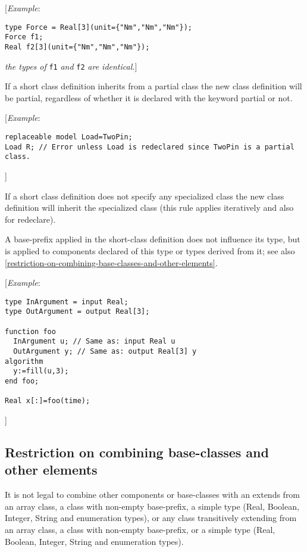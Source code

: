 {[}\emph{Example}:
\begin{lstlisting}[language=modelica]
type Force = Real[3](unit={"Nm","Nm","Nm"});
Force f1;
Real f2[3](unit={"Nm","Nm","Nm"});
\end{lstlisting}
\emph{the types of} \lstinline!f1! \emph{and} \lstinline!f2! \emph{are identical.}{]}

If a short class definition inherits from a partial class the new class
definition will be partial, regardless of whether it is declared with
the keyword partial or not.

{[}\emph{Example}:
\begin{lstlisting}[language=modelica]
replaceable model Load=TwoPin;
Load R; // Error unless Load is redeclared since TwoPin is a partial class.
\end{lstlisting}

{]}

If a short class definition does not specify any specialized class the
new class definition will inherit the specialized class (this rule
applies iteratively and also for redeclare).

A base-prefix applied in the short-class definition does not influence
its type, but is applied to components declared of this type or types
derived from it; see also \autoref{restriction-on-combining-base-classes-and-other-elements}.

{[}\emph{Example}:
\begin{lstlisting}[language=modelica]
type InArgument = input Real;
type OutArgument = output Real[3];

function foo
  InArgument u; // Same as: input Real u
  OutArgument y; // Same as: output Real[3] y
algorithm
  y:=fill(u,3);
end foo;

Real x[:]=foo(time);
\end{lstlisting}

{]}

\subsection{Restriction on combining base-classes and other elements}

It is not legal to combine other components or base-classes with an
extends from an array class, a class with non-empty base-prefix, a
simple type (Real, Boolean, Integer, String and enumeration types), or
any class transitively extending from an array class, a class with
non-empty base-prefix, or a simple type (Real, Boolean, Integer, String
and enumeration types).

